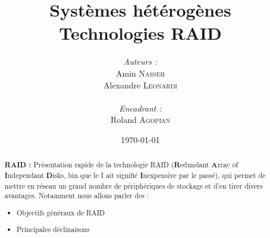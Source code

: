 \documentclass[a4paper,11pt]{article}
\title{
  \textbf{Systèmes hétérogènes}\\
  Technologies RAID
}
\author{
\begin{minipage}{0.4\textwidth}
	\begin{flushleft} \large
		\emph{Auteurs :}\\
                Amin \textsc{Nasseh}\\
		Alexandre \textsc{Leonardi}\\
	\end{flushleft}
\end{minipage}
\begin{minipage}{0.4\textwidth}
	\begin{flushright} \large
		\emph{Encadrant :} \\
		Roland \textsc{Agopian}\\
	\end{flushright}
\end{minipage}
}
\date{\today}
\begin{document}
\maketitle
\thispagestyle{empty}
\begin{abstract}
\textbf{RAID :} Présentation rapide de la technologie RAID (\textbf{R}edundant \textbf{A}rray of \textbf{I}ndependant \textbf{D}isks, bin que le I ait signifié \textbf{I}nexpensive par le passé), qui permet de mettre en réseau un grand nombre de périphériques de stockage et d'en tirer divers avantages. Notamment nous allons parler des :
\begin{itemize}
	\item Objectifs généraux de RAID
    \item Principales déclinaisons 
\end{itemize}
\end{abstract}
\pagebreak

\tableofcontents
\pagebreak



\pagebreak

\pagebreak

\pagebreak

\pagebreak
\nocite{*}

\end{document}
